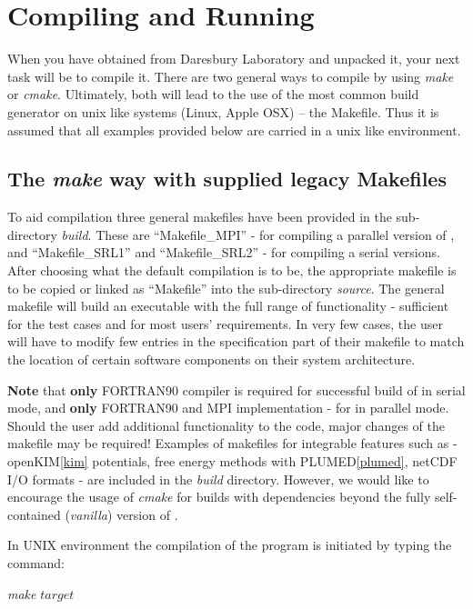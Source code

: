 \section{Compiling and Running \D}
\label{compilation}

When you have obtained \D from Daresbury Laboratory and unpacked it,
your next task will be to compile it.  There are two general ways to
compile \D by using {\sl make} or {\sl cmake}.  Ultimately, both will
lead to the use of the most common build generator on unix like systems
(Linux, Apple OSX) -- the Makefile.  Thus it is assumed that all
examples provided below are carried in a unix like environment.

\subsection{The {\sl make} way with supplied legacy Makefiles}
\label{make}

To aid compilation three general makefiles have been provided
in the sub-directory {\em build}.  These are ``Makefile\_MPI'' -
for compiling a parallel version of \D, and ``Makefile\_SRL1'' and
``Makefile\_SRL2'' - for compiling a serial versions.  After choosing
what the default compilation is to be, the appropriate makefile is
to be copied or linked as ``Makefile'' into the sub-directory
{\em source}.  The general \D makefile will build an executable with
the full range of functionality - sufficient for the test cases and
for most users' requirements.  In very few cases, the user will have
to modify few entries in the specification part of their makefile to
match the location of certain software components on their system architecture.

{\bf Note} that {\bf only} FORTRAN90 compiler is required for
successful build of \D in serial mode, and {\bf only}
FORTRAN90 and MPI implementation - for \D in
parallel mode.  Should the user add additional functionality to
the code, major changes of the makefile may be required!  Examples
of makefiles for integrable features such as - openKIM\ref{kim}
potentials, free energy methods with PLUMED\ref{plumed}, netCDF
I/O formats - are included in the {\em build} directory.  However,
we would like to encourage the usage of {\sl cmake} for builds
with dependencies beyond the fully self-contained ({\em vanilla})
version of \D.

In UNIX environment the compilation of the program is initiated by
typing the command:

{\sl make} $target$

